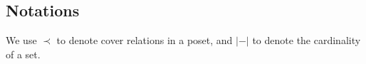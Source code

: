 
\subsection*{Notations}

We use $\prec$ to denote cover relations in a poset, and $|-|$ to denote the cardinality of a set.

